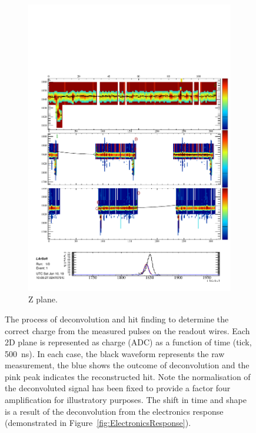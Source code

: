 \begin{figure}
\begin{subfigure}[t]{0.3\linewidth}
    \includegraphics[width=\textwidth]{HitFindingZ.pdf}
    \caption{Z plane.}
    \label{fig:HitFindingZ}
  \end{subfigure}
  \caption[The process of deconvolution and hit finding to determine the correct charge from the measured pulses on the readout wires.]{The process of deconvolution and hit finding to determine the correct charge from the measured pulses on the readout wires.  Each 2D plane is represented as charge (ADC) as a function of time (tick, 500~ns).  In each case, the black waveform represents the raw measurement, the blue shows the outcome of deconvolution and the pink peak indicates the reconstructed hit.  Note the normalisation of the deconvoluted signal has been fixed to provide a factor four amplification for illustratory purposes.  The shift in time and shape is a result of the deconvolution from the electronics response (demonstrated in Figure~\ref{fig:ElectronicsResponse}).}
  \label{fig:HitFinding}
\end{figure}

